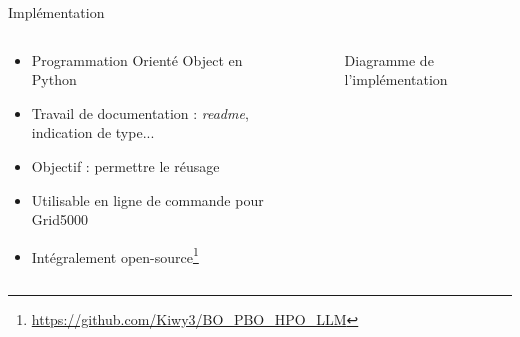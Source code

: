 \begin{frame}{Implémentation}
    \begin{columns}
        \begin{column}[t]{0.45\textwidth} 
            \begin{block}{}
                
                \begin{itemize}
                    \item Programmation Orienté Object en Python
                    \item Travail de documentation : \textit{readme}, indication de type...
                    \item Objectif : permettre le réusage
                    \item Utilisable en ligne de commande pour Grid5000
                    \item Intégralement open-source\footnote[4]{\url{https://github.com/Kiwy3/BO_PBO_HPO_LLM}}
                \end{itemize}
            \end{block}
     
            \end{column}
                 
            \begin{column}[t]{0.45\textwidth}
                \begin{figure}
                    \centering
                    
                    \caption{Diagramme de l'implémentation}
                \end{figure}
            \end{column}
                 
    \end{columns}


\end{frame}
